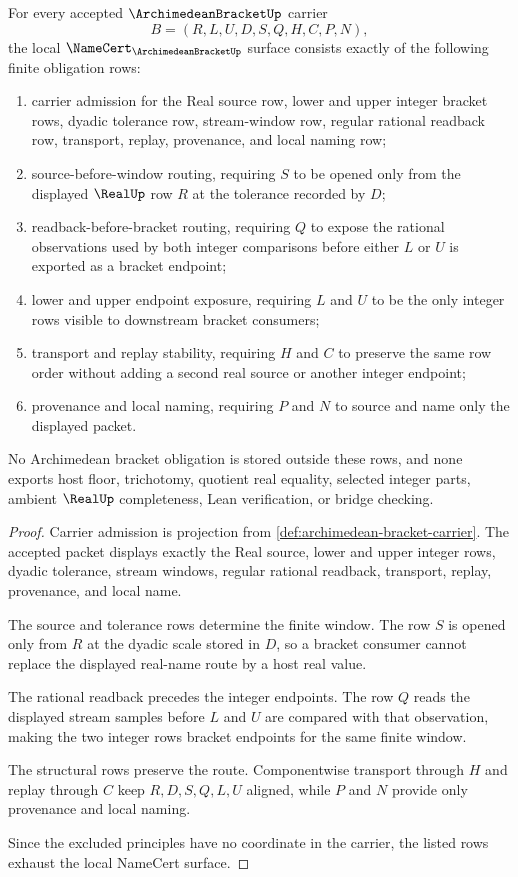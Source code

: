 \begin{theorem}
\label{thm:archimedean-bracket-namecert-obligations}
For every accepted $\ArchimedeanBracketUp$ carrier
$$
B=(R,L,U,D,S,Q,H,C,P,N),
$$
the local $\NameCert_{\ArchimedeanBracketUp}$ surface consists exactly of the following finite obligation rows:
\begin{enumerate}
\item carrier admission for the Real source row, lower and upper integer bracket rows, dyadic tolerance row, stream-window row, regular rational readback row, transport, replay, provenance, and local naming row;
\item source-before-window routing, requiring $S$ to be opened only from the displayed $\RealUp$ row $R$ at the tolerance recorded by $D$;
\item readback-before-bracket routing, requiring $Q$ to expose the rational observations used by both integer comparisons before either $L$ or $U$ is exported as a bracket endpoint;
\item lower and upper endpoint exposure, requiring $L$ and $U$ to be the only integer rows visible to downstream bracket consumers;
\item transport and replay stability, requiring $H$ and $C$ to preserve the same row order without adding a second real source or another integer endpoint;
\item provenance and local naming, requiring $P$ and $N$ to source and name only the displayed packet.
\end{enumerate}
No Archimedean bracket obligation is stored outside these rows, and none exports host floor, trichotomy, quotient real equality, selected integer parts, ambient $\RealUp$ completeness, Lean verification, or bridge checking.
\end{theorem}
\begin{proof}
Carrier admission is projection from \autoref{def:archimedean-bracket-carrier}. The accepted packet displays exactly the Real source, lower and upper integer rows, dyadic tolerance, stream windows, regular rational readback, transport, replay, provenance, and local name.

The source and tolerance rows determine the finite window. The row $S$ is opened only from $R$ at the dyadic scale stored in $D$, so a bracket consumer cannot replace the displayed real-name route by a host real value.

The rational readback precedes the integer endpoints. The row $Q$ reads the displayed stream samples before $L$ and $U$ are compared with that observation, making the two integer rows bracket endpoints for the same finite window.

The structural rows preserve the route. Componentwise transport through $H$ and replay through $C$ keep $R,D,S,Q,L,U$ aligned, while $P$ and $N$ provide only provenance and local naming.

Since the excluded principles have no coordinate in the carrier, the listed rows exhaust the local NameCert surface.
\end{proof}

